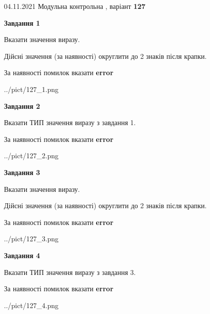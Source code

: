 \documentclass[11pt, ukrainian]{article}
\begin{document}
{04.11.2021 Модульна контрольна , варіант  \No \textbf { 127 }\par}
{
\begin {large}
{\begin {center}\textbf{Завдання 1}\end {center}}\par
Вказати значення виразу. \par
Дійсні значення (за наявності) округлити до 2 знаків після крапки. \par
За наявності помилок вказати \textbf{error}

\begin{center}
	{../pict/127_1.png}
\end{center}
\newpage

{\begin {center}\textbf{Завдання 2}\end {center}}\par
Вказати ТИП значення виразу з завдання 1. \par
За наявності помилок вказати \textbf{error}

\begin{center}
	{../pict/127_2.png}
\end{center}
\newpage

{\begin {center}\textbf{Завдання 3}\end {center}}\par
Вказати значення виразу. \par
Дійсні значення (за наявності) округлити до 2 знаків після крапки. \par
За наявності помилок вказати \textbf{error}

\begin{center}
	{../pict/127_3.png}
\end{center}
\newpage

{\begin {center}\textbf{Завдання 4}\end {center}}\par
Вказати ТИП значення виразу з завдання 3. \par
За наявності помилок вказати \textbf{error}

\begin{center}
	{../pict/127_4.png}
\end{center}
\newpage


\end{large}}
\end{document}
